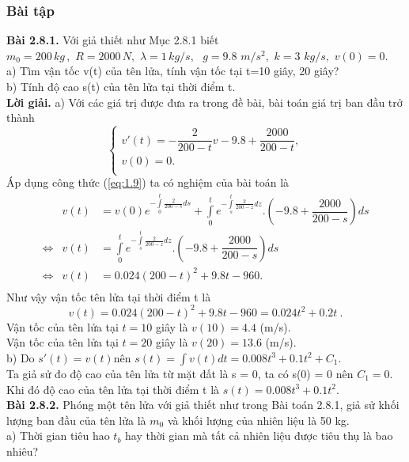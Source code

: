 \subsubsection{Bài tập}
\noindent \textbf{Bài 2.8.1.} Với giả thiết như Mục 2.8.1 biết ${{m}_{0}}=200\,kg\,,\,\,R=2000\,N,\,\,\lambda =1\,kg/s,\,\,$ $g=9.8\,\,m/{{s}^{2}},\,\,k=3\,\,kg/s,\,\,v(0)=0$.\\
a) Tìm vận tốc v(t) của tên lửa, tính vận tốc tại t=10 giây, 20 giây?\\
b) Tính độ cao s(t) của tên lửa tại thời điểm t. \\
\textbf{Lời giải.}
a) Với các giá trị được đưa ra trong đề bài, bài toán giá trị ban đầu trở thành
$$\left\{ \begin{array}{l}
	 v'(t)=-\dfrac{2}{200-t}v-9.8+\dfrac{2000}{200-t}, \\ 
 v(0)=0. \\ 
\end{array} \right.$$
Áp dụng công thức (\ref{eq:1.9}) ta có nghiệm của bài toán là
\[\begin{array}{lll}
	 &v(t)&=v(0){{e}^{-\int\limits_{0}^{t}{\frac{2}{200-s}ds}}}+\int\limits_{0}^{t}{{{e}^{-\int\limits_{s}^{t}{\frac{2}{200-z}dz}}}}.\left( -9.8+\dfrac{2000}{200-s} \right)ds \\ 
	 \Leftrightarrow &v(t)&=\int\limits_{0}^{t}{{{e}^{-\int\limits_{s}^{t}{\frac{2}{200-z}dz}}}}.\left( -9.8+\dfrac{2000}{200-s} \right)ds \\ 
	 \Leftrightarrow &v(t)&=0.024{{(200-t)}^{2}}+9.8t-960. \\ 
\end{array}\]
Như vậy vận tốc tên lửa tại thời điểm t là
$$v(t)=0.024{{(200-t)}^{2}}+9.8t-960=0.024{{t}^{2}}+0.2t \ .$$
Vận tốc của tên lửa tại $t=10$ giây là $v(10)=4.4$ (m/s).\\
Vận tốc của tên lửa tại $t=20$ giây là $v(20)=13.6$ (m/s).\\
b) Do ${s}'(t)=v(t)$nên $s(t)=\int{v(t)dt}=0.008{{t}^{3}}+0.1{{t}^{2}}+{{C}_{1}}.$\\
Ta giả sử đo độ cao của tên lửa từ mặt đất là s = 0, ta có s(0) = 0 nên $C_1 = 0$.\\
Khi đó độ cao của tên lửa tại thời điểm t là $s(t)=0.008{{t}^{3}}+0.1{{t}^{2}}$.\\
\textbf{Bài 2.8.2.} Phóng một tên lửa với giả thiết như trong Bài toán 2.8.1, giả sử khối lượng ban đầu của tên lửa là $m_0$ và khối lượng của nhiên liệu là 50 kg.\\
a) Thời gian tiêu hao $t_b$ hay thời gian mà tất cả nhiên liệu được tiêu thụ là bao nhiêu?\\
